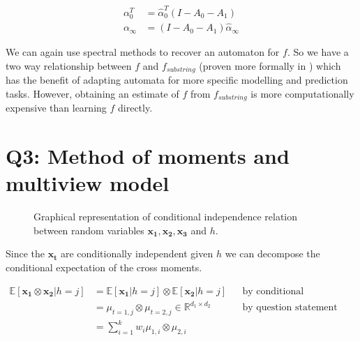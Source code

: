 \documentclass[11pt]{amsart}
\newcommand{\vek}[1]{\mathbf{#1}}
\begin{document}
\begin{equation}
\begin{aligned}
\alpha_{0}^T &= \hat{\alpha}_0^T (I - A_0 - A_1) \\
\alpha_{\infty} &=  (I - A_0 - A_1) \hat{\alpha}_{\infty}
\end{aligned}
\end{equation}

We can again use spectral methods to recover an automaton for $f$. So we have a two way relationship between $f$ and $f_{substring}$ (proven more formally in \cite{balle2014spectral}) which has the benefit of adapting automata for more specific modelling and prediction tasks. However, obtaining an estimate of $f$ from $f_{substring}$ is more computationally expensive than learning $f$ directly. 



\section{Q3: Method of moments and multiview model}

\begin{figure}[h]
\caption{Graphical representation of conditional independence relation between random variables $\vek{x_1, x_2, x_3}$ and $h$.}
\label{fig:graph}
\end{figure}

Since the $\vek{x_t}$ are conditionally independent given $h$ we can decompose the conditional expectation of the cross moments.

\begin{equation}
\begin{aligned}
\mathbb{E}[\vek{x_1} \otimes \vek{x_2} \vert h=j] &= \mathbb{E}[\vek{x_1} \vert h=j] \otimes \mathbb{E}[\vek{x_2} \vert h=j] && \text{by conditional independence} \\
								           &= \mu_{t=1, j} \otimes \mu_{t=2, j}  \in \mathbb{R}^{d_1 \times d_2}&& \text{by question statement}\\
								           &= \sum_{i=1}^k w_i \mu_{1,i} \otimes \mu_{2, i}
\end{aligned}
\end{equation}
\end{document}
